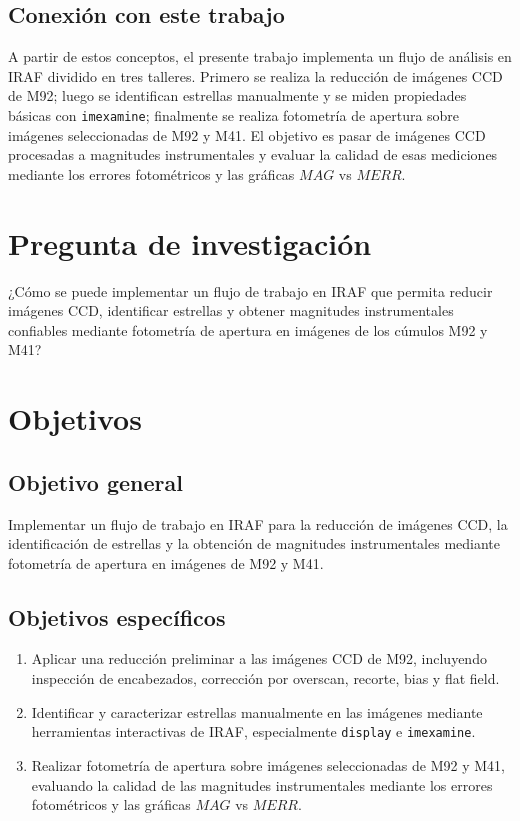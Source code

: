 \documentclass[12pt,letterpaper]{article}
\begin{document}
\subsection{Conexión con este trabajo}

A partir de estos conceptos, el presente trabajo implementa un flujo de análisis en IRAF dividido en tres talleres. Primero se realiza la reducción de imágenes CCD de M92; luego se identifican estrellas manualmente y se miden propiedades básicas con \texttt{imexamine}; finalmente se realiza fotometría de apertura sobre imágenes seleccionadas de M92 y M41. El objetivo es pasar de imágenes CCD procesadas a magnitudes instrumentales y evaluar la calidad de esas mediciones mediante los errores fotométricos y las gráficas $MAG$ vs $MERR$.

\section{Pregunta de investigación}

¿Cómo se puede implementar un flujo de trabajo en IRAF que permita reducir imágenes CCD, identificar estrellas y obtener magnitudes instrumentales confiables mediante fotometría de apertura en imágenes de los cúmulos M92 y M41?

\section{Objetivos}

\subsection{Objetivo general}

Implementar un flujo de trabajo en IRAF para la reducción de imágenes CCD, la identificación de estrellas y la obtención de magnitudes instrumentales mediante fotometría de apertura en imágenes de M92 y M41.

\subsection{Objetivos específicos}

\begin{enumerate}
    \item Aplicar una reducción preliminar a las imágenes CCD de M92, incluyendo inspección de encabezados, corrección por overscan, recorte, bias y flat field.

    \item Identificar y caracterizar estrellas manualmente en las imágenes mediante herramientas interactivas de IRAF, especialmente \texttt{display} e \texttt{imexamine}.

    \item Realizar fotometría de apertura sobre imágenes seleccionadas de M92 y M41, evaluando la calidad de las magnitudes instrumentales mediante los errores fotométricos y las gráficas $MAG$ vs $MERR$.
\end{enumerate}
\end{document}
